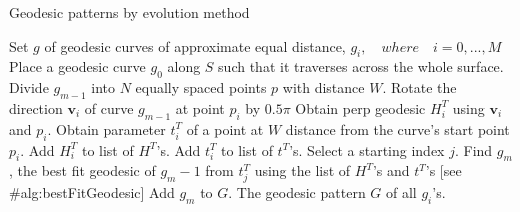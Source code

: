 \begin{algorithm}[H]
\label{evolutionMethod}
\caption{Geodesic patterns by evolution method}
\scriptsize
\renewcommand{\algorithmicrequire}{\textbf{Input:}}
\renewcommand{\algorithmicensure}{\textbf{Output:}}
\begin{algorithmic}[1]
\ENSURE Set $g$ of geodesic curves of approximate equal distance, $g_i,\quad where \quad i=0,...,M$
\STATE Place a geodesic curve $g_0$ along $S$ such that it traverses across the whole surface.
 
    \STATE Divide $g_{m-1}$ into $N$ equally spaced points $p$ with distance $W$.
        \STATE Rotate the direction $\mathbf{v}_i$ of curve $g_{m-1}$ at point $p_i$ by $0.5\pi$
        \STATE Obtain perp geodesic $H^T_i$ using $\mathbf{v}_i$ and $p_i$.
        \STATE Obtain parameter $t^T_i$ of a point at $W$ distance from the curve's start point $p_i$.
        \STATE Add $H^T_i$ to list of $H^T$'s.
        \STATE Add $t^T_i$ to list of $t^T$'s.
    \ENDFOR
    \STATE Select a starting index $j$.
    \STATE Find $g_m$, the best fit geodesic of $g_m-1$ from $t^T_j$ using the list of $H^T$'s and $t^T$'s [see #alg:bestFitGeodesic]
        \STATE Add $g_m$ to $G$.
    \ENDIF
\ENDFOR
\RETURN The geodesic pattern $G$ of all $g_i$'s.
\end{algorithmic}
\end{algorithm}